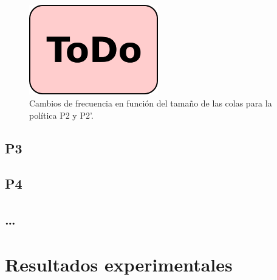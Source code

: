 \begin{figure}
  \centering
  \includegraphics[width=0.5\textwidth]{Figures/todo.png}

  \caption{Cambios de frecuencia en función del tamaño de las colas para la
    política P2 y P2'.}
  \label{s5:fig:p2}
\end{figure}








\subsection{P3}

\subsection{P4}

\subsection{\ldots}


\section{Resultados experimentales}



